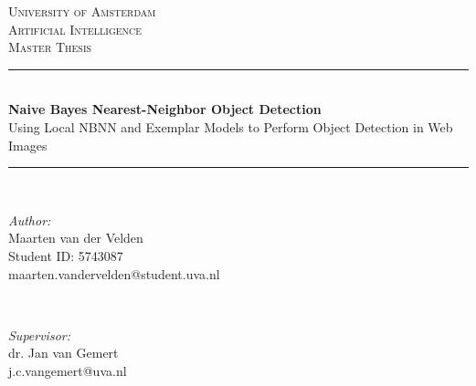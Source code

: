 \documentclass[a4paper,10pt]{report}
\begin{document}
\begin{titlepage}

\newcommand{\HRule}{\rule{\linewidth}{0.5mm}} %
\center %
 

\textsc{\LARGE University of Amsterdam}\\[1.0cm] %
\textsc{\Large Artificial Intelligence}\\[0.5cm] %
\textsc{\large Master Thesis}\\[1.0cm] %


\HRule \\[0.4cm]
{ \huge \bfseries Naive Bayes Nearest-Neighbor Object Detection}\\[0.1cm]
{ \large Using Local NBNN and Exemplar Models to Perform Object Detection in Web Images}\\[0.2cm]
\HRule \\[1.5cm]
 

\begin{minipage}{0.4\textwidth}
\begin{flushleft} \large
\emph{Author:}\\
Maarten van der Velden\\
Student ID: 5743087\\
maarten.vandervelden@student.uva.nl
\end{flushleft}
\end{minipage}
~
\begin{minipage}{0.4\textwidth}
\begin{flushright} \large
\emph{Supervisor:} \\
dr. Jan van Gemert\\
j.c.vangemert@uva.nl
\end{flushright}
\end{minipage}\\[2cm]


\end{titlepage}
\end{document}
